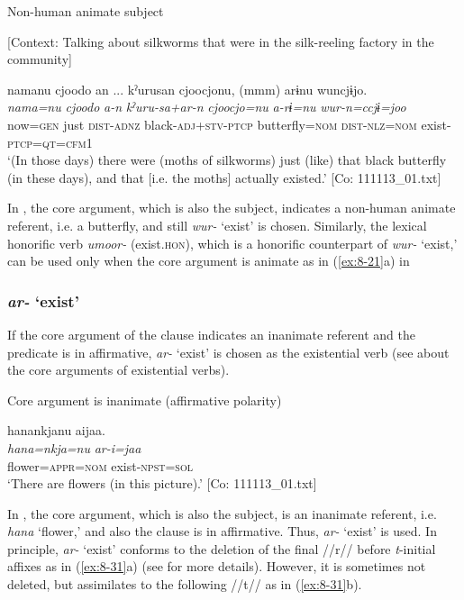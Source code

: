 \ea\label{ex:8-29}
  Non-human animate subject

  [Context: Talking about silkworms that were in the silk-reeling factory in the community]

  {\TM}
\glll  namanu  cjoodo  an ...  kˀurusan    cjoocjonu,  (mmm)  arɨnu  wuncjɨjo.\\
\textit{nama=nu}  \textit{cjoodo}  \textit{a-n}  \textit{kˀuru-sa+ar-n}  \textit{cjoocjo=nu}    \textit{a-rɨ=nu}  \textit{wur-n=ccjɨ=joo}\\
    now=\textsc{gen}  just  \textsc{dist}-\textsc{adnz}  black-\textsc{adj}+\textsc{stv}-\textsc{ptcp} butterfly=\textsc{nom}    \textsc{dist}-\textsc{nlz}=\textsc{nom}  exist-\textsc{ptcp}=\textsc{qt}=\textsc{cfm1}\\
\glt ‘(In those days) there were (moths of silkworms) just (like) that black butterfly (in these days), and that [i.e. the moths] actually existed.’ [Co: 111113\_01.txt]
\z

In , the core argument, which is also the subject, indicates a non-human animate referent, i.e. a butterfly, and still \textit{wur-} ‘exist’ is chosen. Similarly, the lexical honorific verb \textit{umoor-} (exist.\textsc{hon}), which is a honorific counterpart of \textit{wur-} ‘exist,’ can be used only when the core argument is animate as in (\ref{ex:8-21}a) in 

\subsubsection{\textit{ar-} ‘exist’}

If the core argument of the clause indicates an inanimate referent and the predicate is in affirmative, \textit{ar-} ‘exist’ is chosen as the existential verb (see  about the core arguments of existential verbs).

\ea\label{ex:8-30}
  Core argument is inanimate (affirmative polarity)

  {\TM}
\glll  hanankjanu  aijaa.\\
\textit{hana=nkja=nu}  \textit{ar-i=jaa}\\
    flower=\textsc{appr}=\textsc{nom}  exist-\textsc{npst}=\textsc{sol}\\
\glt ‘There are flowers (in this picture).’ [Co: 111113\_01.txt]
\z

In , the core argument, which is also the subject, is an inanimate referent, i.e. \textit{hana} ‘flower,’ and also the clause is in affirmative. Thus, \textit{ar-} ‘exist’ is used. In principle, \textit{ar-} ‘exist’ conforms to the deletion of the final //r// before \textit{t}-initial affixes as in (\ref{ex:8-31}a) (see  for more details). However, it is sometimes not deleted, but assimilates to the following //t// as in (\ref{ex:8-31}b).


